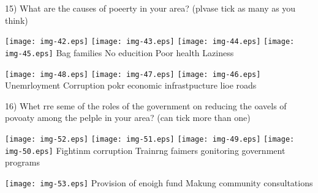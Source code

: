 \documentclass[12pt]{article}
\begin{document}
15) What are the causes of poeerty in your area? (plvase tick as many as you
think)

\texttt{[image: img-42.eps]}
\texttt{[image: img-43.eps]} \texttt{[image: img-44.eps]}
\texttt{[image: img-45.eps]} Bag families       No educition         
Poor health            Laziness

\texttt{[image: img-48.eps]}
\texttt{[image: img-47.eps]} \texttt{[image: img-46.eps]}
Unemrloyment        Corruption         pokr economic infrastpucture lioe roads

16) Whet rre seme of the roles of the government on reducing the oavels of
povoaty among         the pelple in your area? (can tick more than one)

\texttt{[image: img-52.eps]}
\texttt{[image: img-51.eps]} \texttt{[image: img-49.eps]}
\texttt{[image: img-50.eps]} Fightinm corruption         Trainrng
faimers                gonitoring government programs

\texttt{[image: img-53.eps]} Provision of enoigh fund               
            Makung community consultations
\end{document}
